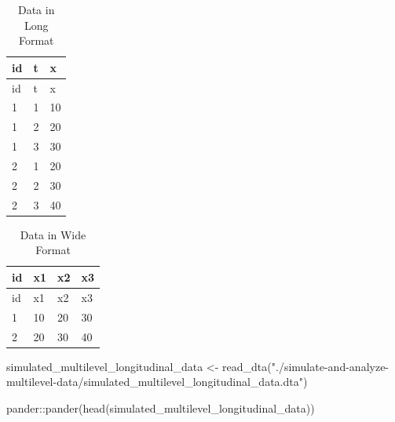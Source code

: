 \documentclass[
  letterpaper,
  DIV=11,
  numbers=noendperiod]{scrreprt}
\newenvironment{Shaded}{\begin{snugshade}}{\end{snugshade}}
\newcommand{\FunctionTok}[1]{\textcolor[rgb]{0.28,0.35,0.67}{#1}}
\newcommand{\NormalTok}[1]{\textcolor[rgb]{0.00,0.23,0.31}{#1}}
\newcommand{\OtherTok}[1]{\textcolor[rgb]{0.00,0.23,0.31}{#1}}
\newcommand{\SpecialCharTok}[1]{\textcolor[rgb]{0.37,0.37,0.37}{#1}}
\newcommand{\StringTok}[1]{\textcolor[rgb]{0.13,0.47,0.30}{#1}}
\begin{document}
\hypertarget{tbl-datalong}{}
\begin{longtable}[]{@{}lll@{}}
\caption{\label{tbl-datalong}Data in Long Format}\tabularnewline
\toprule()
id & t & x \\
\midrule()
\endfirsthead
\toprule()
id & t & x \\
\midrule()
\endhead
1 & 1 & 10 \\
1 & 2 & 20 \\
1 & 3 & 30 \\
2 & 1 & 20 \\
2 & 2 & 30 \\
2 & 3 & 40 \\
\bottomrule()
\end{longtable}

\hypertarget{tbl-datawide}{}
\begin{longtable}[]{@{}llll@{}}
\caption{\label{tbl-datawide}Data in Wide Format}\tabularnewline
\toprule()
id & x1 & x2 & x3 \\
\midrule()
\endfirsthead
\toprule()
id & x1 & x2 & x3 \\
\midrule()
\endhead
1 & 10 & 20 & 30 \\
2 & 20 & 30 & 40 \\
\bottomrule()
\end{longtable}

\begin{Shaded}
\begin{Highlighting}[]
\NormalTok{simulated\_multilevel\_longitudinal\_data }\OtherTok{\textless{}{-}} 
  \FunctionTok{read\_dta}\NormalTok{(}\StringTok{"./simulate{-}and{-}analyze{-}multilevel{-}data/simulated\_multilevel\_longitudinal\_data.dta"}\NormalTok{)}
\end{Highlighting}
\end{Shaded}

\begin{Shaded}
\begin{Highlighting}[]
\NormalTok{pander}\SpecialCharTok{::}\FunctionTok{pander}\NormalTok{(}\FunctionTok{head}\NormalTok{(simulated\_multilevel\_longitudinal\_data))}
\end{Highlighting}
\end{Shaded}
\end{document}

